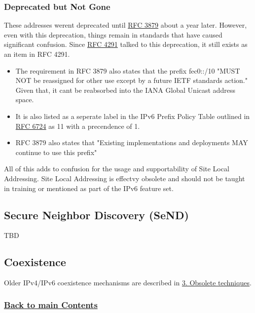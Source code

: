 \documentclass[
]{article}
\providecommand{\tightlist}{%
  \setlength{\itemsep}{0pt}\setlength{\parskip}{0pt}}
\begin{document}
\subsubsection{Deprecated but Not Gone}\label{deprecated-but-not-gone}

These addresses weren\textquotesingle t deprecated until
\href{https://www.rfc-editor.org/rfc/rfc3879}{RFC 3879} about a year
later. However, even with this deprecation, things remain in standards
that have caused significant confusion. Since
\href{https://www.rfc-editor.org/rfc/rfc4291.html\#section-2.5.7}{RFC
4291} talked to this deprecation, it still exists as an item in RFC
4291.

\begin{itemize}
\tightlist
\item
  The requirement in RFC 3879 also states that the prefix fec0::/10
  "MUST NOT be reassigned for other use except by a future IETF
  standards action." Given that, it can\textquotesingle t be reabsorbed
  into the IANA Global Unicast address space.
\item
  It is also listed as a seperate label in the IPv6 Prefix Policy Table
  outlined in \href{https://www.rfc-editor.org/rfc/rfc6724.html}{RFC
  6724} as 11 with a precendence of 1.
\item
  RFC 3879 also states that "Existing implementations and deployments
  MAY continue to use this prefix"
\end{itemize}

All of this adds to confusion for the usage and supportability of Site
Local Addressing. Site Local Addressing is effectvy obsolete and should
not be taught in training or mentioned as part of the IPv6 feature set.

\subsection{Secure Neighbor Discovery
(SeND)}\label{secure-neighbor-discovery-send}

TBD

\subsection{Coexistence}\label{coexistence}

Older IPv4/IPv6 coexistence mechanisms are described in
\hyperref[obsolete-techniques]{3. Obsolete techniques}.

\subsubsection{\texorpdfstring{\hyperref[list-of-contents]{Back to main
Contents}}{Back to main Contents}}\label{back-to-main-contents-9}
\end{document}
